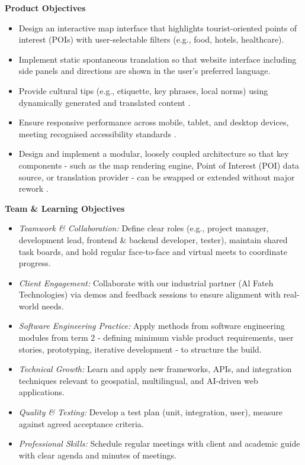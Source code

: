 \textbf{Product Objectives}
\begin{itemize}
  \item Design an interactive map interface that highlights tourist-oriented points of interest (POIs) with user-selectable filters (e.g., food, hotels, healthcare).
  \item Implement static spontaneous translation so that website interface including side panels and directions are shown in the user’s preferred language.
  \item Provide cultural tips (e.g., etiquette, key phrases, local norms) using dynamically generated and translated content \cite{gpt_culturetips}.
  \item Ensure responsive performance across mobile, tablet, and desktop devices, meeting recognised accessibility standards \cite{responsiveDesign}.
  \item Design and implement a modular, loosely coupled architecture so that key components - such as the map rendering engine, Point of Interest (POI) data source, or translation provider - can be swapped or extended without major rework \cite{modularApps}.
\end{itemize}

\textbf{Team \& Learning Objectives}
\begin{itemize}
  \item \textit{Teamwork \& Collaboration:} Define clear roles (e.g., project manager, development lead, frontend \& backend developer, tester), maintain shared task boards, and hold regular face-to-face and virtual meets to coordinate progress.
  \item \textit{Client Engagement:} Collaborate with our industrial partner (Al Fateh Technologies) via demos and feedback sessions to ensure alignment with real-world needs.
  \item \textit{Software Engineering Practice:} Apply methods from software engineering modules from term 2 - defining minimum viable product requirements, user stories, prototyping, iterative development - to structure the build.
  \item \textit{Technical Growth:} Learn and apply new frameworks, APIs, and integration techniques relevant to geospatial, multilingual, and AI-driven web applications.
  \item \textit{Quality \& Testing:} Develop a test plan (unit, integration, user), measure against agreed acceptance criteria.
  \item \textit{Professional Skills:} Schedule regular meetings with client and academic guide with clear agenda and minutes of meetings.
\end{itemize}

